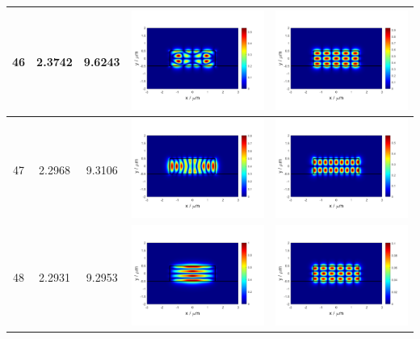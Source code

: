 \documentclass{assignment}
\begin{document}
\begin{sol}
\begin{itemize}
\begin{longtable}[c]{|c|c|c|c|c|}
            46 & 2.3742 & 9.6243 & \includegraphics[width=.3\columnwidth]{Assignment-2-mode-46-Ex.png} & \includegraphics[width=.3\columnwidth]{Assignment-2-mode-46-Ey.png} \\ \hline
            47 & 2.2968 & 9.3106 & \includegraphics[width=.3\columnwidth]{Assignment-2-mode-47-Ex.png} & \includegraphics[width=.3\columnwidth]{Assignment-2-mode-47-Ey.png} \\ \hline
            48 & 2.2931 & 9.2953 & \includegraphics[width=.3\columnwidth]{Assignment-2-mode-48-Ex.png} & \includegraphics[width=.3\columnwidth]{Assignment-2-mode-48-Ey.png} \\ \hline

\end{longtable}
\end{itemize}
\end{sol}
\end{document}
